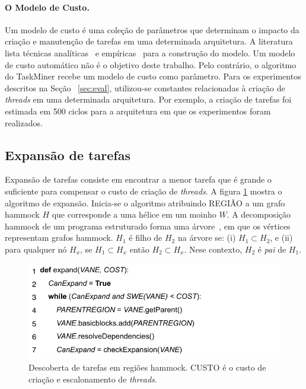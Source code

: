 \documentclass[sigplan,10pt,review]{acmart}
\newcommand\Taskminer{\mbox{\textsf{TaskMiner}}}
\begin{document}
\paragraph{O Modelo de Custo.}
Um modelo de custo é uma coleção de parâmetros que determinam o impacto
da criação e manutenção de tarefas em uma determinada arquitetura.
A literatura lista técnicas analíticas~\cite{Baghsorkhi10} e empíricas~\cite{Poesia17}
para a construção do modelo. Um modelo de custo automático não é o objetivo deste trabalho.
Pelo contrário, o algoritmo do {\Taskminer} recebe um modelo de custo como parâmetro.
Para os experimentos descritos na Seção ~\ref{sec:eval}, utilizou-se constantes
relacionadas à criação de {\em threads} em uma determinada arquitetura. Por exemplo,
a criação de tarefas foi estimada em 500 ciclos para a arquitetura em que os experimentos
foram realizados.

\subsection{Expansão de tarefas}
\label{sub:expansion}

Expansão de tarefas consiste em encontrar a menor tarefa que é grande o suficiente
para compensar o custo de criação de {\em threads}. A figura \ref{fig:expand_alg}
mostra o algoritmo de expansão. Inicia-se o algoritmo atribuindo \textsf{REGIÃO} a
um grafo hammock $H$ que corresponde a uma hélice em um moinho $W$.
A decomposição hammock de um programa estruturado forma uma árvore~\cite{Ferrante87},
em que os vértices representam grafos hammock.
$H_1$ é filho de $H_2$ na árvore se:
(i) $H_1 \subset H_2$, e (ii) para qualquer 
nó $H_x$, se $H_1 \subset H_x$ então $H_2 \subset H_x$.
Nese contexto, $H_2$ é {\em pai} de $H_1$.

\begin{figure}[h]
\begin{center}
\includegraphics[width=1\columnwidth]{images/expand_alg}
\caption{Descoberta de tarefas em regiões hammock.
\textsf{CUSTO} é o custo de criação e escalonamento de {\em threads}.}
\label{fig:expand_alg}
\end{center}
\end{figure}
\end{document}
